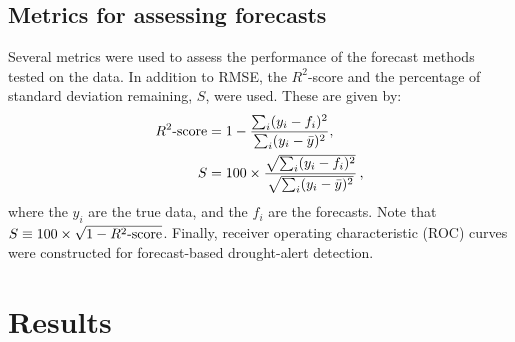 \documentclass[review]{elsarticle}
\begin{document}
\subsection{Metrics for assessing forecasts}
Several metrics were used to assess the performance of the forecast methods tested on the data. In addition to RMSE, the $R^2$-score and the percentage of standard deviation remaining, $S$, were used. These are given by:
\begin{align}
	R^2{\text -}{\rm score} &= 1 - \frac{\sum_i (y_i - f_i)^2 }{\sum_i (y_i - \bar{y})^2}, \label{eq:r2} \\
	S &= 100 \times \frac{\sqrt{ \sum_i (y_i-f_i)^2 }}{\sqrt{  \sum_i (y_i-\bar{y})^2 }} \label{eq:S}\,,
\end{align}
where the $y_i$ are the true data, and the $f_i$ are the forecasts. Note that $S\equiv 100\times\sqrt{1-R^2{\text -}\rm{score}}$.  Finally, receiver operating characteristic (ROC) curves were constructed for forecast-based drought-alert detection. 

\section{Results} \label{sec:results}

\subsection{}
\end{document}
